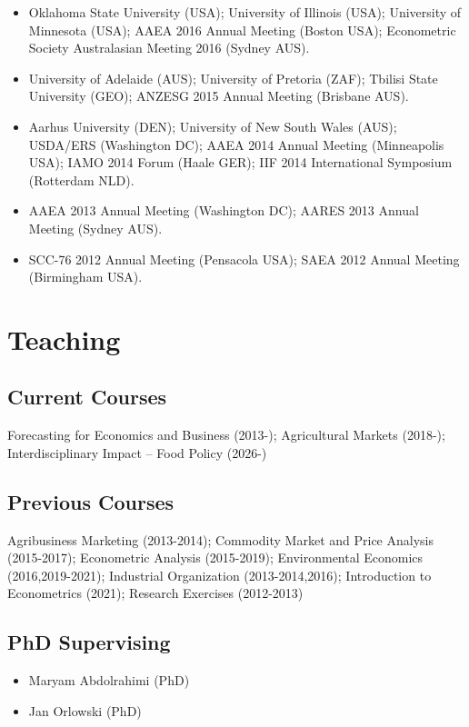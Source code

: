 \documentclass[10pt]{article}
\begin{document}
\begin{itemize}
		\item {} Oklahoma State University (USA); University of Illinois (USA); University of Minnesota (USA); AAEA 2016 Annual Meeting (Boston USA); Econometric Society Australasian Meeting 2016 (Sydney AUS).
		\item {} University of Adelaide (AUS); University of Pretoria (ZAF); Tbilisi State University (GEO); ANZESG 2015 Annual Meeting (Brisbane AUS).
		\item {} Aarhus University (DEN); University of New South Wales (AUS); USDA/ERS (Washington DC); AAEA 2014 Annual Meeting (Minneapolis USA); IAMO 2014 Forum (Haale GER); IIF 2014 International Symposium (Rotterdam NLD).
		\item {} AAEA 2013 Annual Meeting (Washington DC); AARES 2013 Annual Meeting (Sydney AUS).
		\item {} SCC-76 2012 Annual Meeting (Pensacola USA); SAEA 2012 Annual Meeting (Birmingham USA).
	\end{itemize}
	
	\bigskip
	
	\section*{Teaching}
	
	\subsection*{Current Courses}
	Forecasting for Economics and Business (2013-); Agricultural Markets (2018-); Interdisciplinary Impact -- Food Policy (2026-)
	
	\subsection*{Previous Courses}	
	Agribusiness Marketing (2013-2014); Commodity Market and Price Analysis (2015-2017); Econometric Analysis (2015-2019); Environmental Economics (2016,2019-2021); Industrial Organization (2013-2014,2016); Introduction to Econometrics (2021); Research Exercises (2012-2013)
	
	\subsection*{PhD Supervising}	
	\begin{itemize}
		\item {} Maryam Abdolrahimi (PhD)
		\item {} Jan Orlowski (PhD)
	\end{itemize}
	
\end{document}
